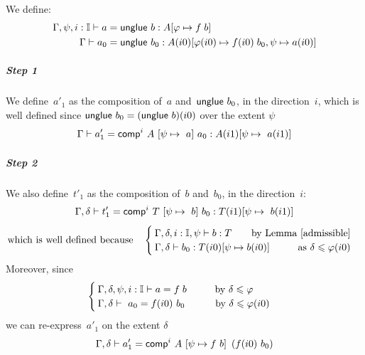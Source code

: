 We define:
\begin{align*}
   \Gamma,\psi,i:\II \der a = & \; \ugl~ b: A[\varphi\mapsto \myeq{} \;  b]%
  \\
  \Gamma\der a_0 = & \; \ugl~ b_0: A(i0)[\varphi(i0)\mapsto \myeq{}(i0) \; b_0,\psi\mapsto a(i0)]%
\end{align*}

\subparagraph*{Step 1} We define~$a'_1$ as the composition of~$a$
and~${\sf unglue}~b_0$, in the direction~$i$, which is well defined since
${\sf unglue}~b_0 = ({\sf unglue}~b)(i0)$ over the extent $\psi$
%
\begin{equation}
  \label{eq:glue-a'1}
  \Gamma \vdash a_1' = {\sf comp}^i~A~[\psi\mapsto~a]~a_0:A(i1)[\psi\mapsto~a(i1)]
\end{equation}

\subparagraph*{Step 2} We also define~$t'_1$ as the composition of~$b$
and~$b_0$, in the direction~$i$:
%
\begin{equation}
  \label{eq:glue-t'1}
  \Gamma,\delta\vdash t_1' = {\sf comp}^i~T~[\psi\mapsto~b]~b_0:T(i1)[\psi\mapsto~b(i1)]
\end{equation}
\[\textrm{which is well defined because}\quad
\begin{cases}
  \Gamma,\delta,i:\II,\psi\der b : T \hfill
   \textrm{by Lemma \ref{admissible}} \\
  \Gamma,\delta\der b_0 : T(i0)[\psi\mapsto b(i0)] \hspace{1cm} \textrm{as~%
    $\delta \leqslant \varphi(i0)$}
\end{cases}\]
%
Moreover, since
\[
\begin{cases}
  \Gamma,\delta,\psi,i:\II \der a = \myeq{} \; b \hspace{1cm} \textrm{by~%
    $\delta \leqslant \varphi$ ~~~~} \\
  \Gamma,\delta\der~a_0=\myeq{}(i0)~b_0 \hfill \textrm{by~%
    $\delta \leqslant \varphi(i0)$}
\end{cases}\]
we can re-express~$a'_1$ on the extent $\delta$
%
\[
\Gamma, \delta \vdash a_1' = {\sf comp}^i~A~[\psi\mapsto f{}~b]~\left(f{}(i0)~b_0\right)
\]
%

